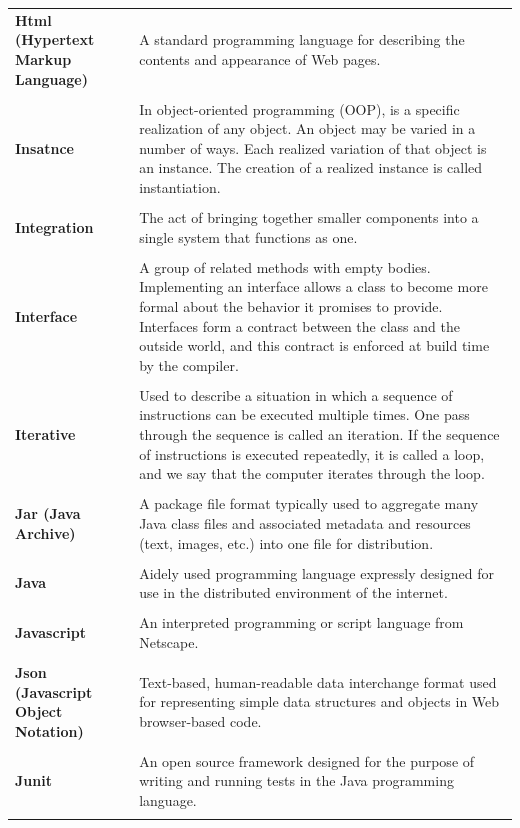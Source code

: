 \documentclass[a4paper,11pt,twoside]{report}
\theoremstyle{definition}
\begin{document}
\begin{longtable}{p{4cm} p{11cm}}
\textbf{Html (Hypertext Markup Language)} & A standard programming language for describing the contents and appearance of Web pages.\\ \\
\textbf{Insatnce} & In object-oriented programming (OOP), is a specific realization of any object. An object may be varied in a number of ways. Each realized variation of that object is an instance. The creation of a realized instance is called instantiation.\\ \\
\textbf{Integration} & The act of bringing together smaller components into a single system that functions as one.\\ \\
\textbf{Interface} & A group of related methods with empty bodies. Implementing an interface allows a class to become more formal about the behavior it promises to provide. Interfaces form a contract between the class and the outside world, and this contract is enforced at build time by the compiler.\\ \\
\textbf{Iterative} & Used to describe a situation in which a sequence of instructions can be executed multiple times. One pass through the sequence is called an iteration. If the sequence of instructions is executed repeatedly, it is called a loop, and we say that the computer iterates through the loop.\\ \\
\textbf{Jar (Java Archive) } & A package file format typically used to aggregate many Java class files and associated metadata and resources (text, images, etc.) into one file for distribution. \\ \\
\textbf{Java} & Aidely used programming language expressly designed for use in the distributed environment of the internet.\\ \\
\textbf{Javascript} & An interpreted programming or script language from Netscape.\\ \\
\textbf{Json (Javascript Object Notation)} & Text-based, human-readable data interchange format used for representing simple data structures and objects in Web browser-based code.\\ \\
\textbf{Junit} & An open source framework designed for the purpose of writing and running tests in the Java programming language.\\ \\


\end{longtable}
\end{document}
